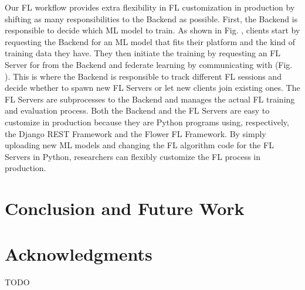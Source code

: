 \documentclass[letterpaper]{article} %
\begin{document}
Our FL workflow provides extra flexibility in FL customization in production by
shifting as many responsibilities to the Backend as possible.
First, the Backend is responsible to decide which ML model to train.
As shown in Fig. , %
clients start by requesting the Backend for an ML model \model{} that fits
their platform and the kind of training data they have.
They then initiate the training by requesting an FL Server \fs{} for \model{}
from the Backend and federate learning by communicating with \fs{}
(Fig. ). %
This is where the Backend is responsible to track different FL sessions and
decide whether
to spawn new FL Servers or let new clients join existing ones.
The FL Servers are subprocesses to the Backend and
manages the actual FL training and evaluation process.
Both the Backend and the FL Servers are easy to customize in production because
they are Python programs using, respectively,
the Django REST Framework and the Flower FL Framework.
By simply uploading new ML models and
changing the FL algorithm code for the FL Servers in Python,
researchers can flexibly customize the FL process in production.


\section{Conclusion and Future Work}


\appendix

\section*{Acknowledgments}
TODO

\bigskip


\end{document}
